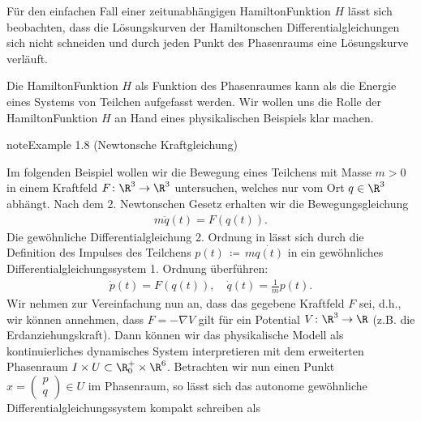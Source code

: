 \documentclass[letterpaper,10pt,english]{jupyterBook}
\begin{document}
\sphinxAtStartPar
Für den einfachen Fall einer zeitunabhängigen Hamilton\sphinxhyphen{}Funktion \(H\) lässt sich beobachten, dass die Lösungskurven der Hamiltonschen Differentialgleichungen sich nicht schneiden und durch jeden Punkt des Phasenraums eine Lösungskurve verläuft.

\sphinxAtStartPar
Die Hamilton\sphinxhyphen{}Funktion \(H\) als Funktion des Phasenraumes kann als die Energie eines Systems von Teilchen aufgefasst werden.
Wir wollen uns die Rolle der Hamilton\sphinxhyphen{}Funktion \(H\) an Hand eines physikalischen Beispiels klar machen.
\label{ode/hamilton:example-3}
\begin{sphinxadmonition}{note}{Example 1.8 (Newtonsche Kraftgleichung)}



\sphinxAtStartPar
Im folgenden Beispiel wollen wir die Bewegung eines Teilchens mit Masse \(m>0\) in einem Kraftfeld \(F \colon \R^3 \rightarrow \R^3\)  untersuchen, welches nur vom Ort \(q \in \R^3\) abhängt.
Nach dem 2. Newtonschen Gesetz erhalten wir die Bewegungsgleichung
\begin{equation}\label{equation:ode/hamilton:eq:newton}
\begin{split}m\ddot{q}(t) = F(q(t)).\end{split}
\end{equation}
\sphinxAtStartPar
Die gewöhnliche Differentialgleichung 2. Ordnung in {\hyperref[\detokenize{ode/hamilton:equation-eq-newton}]{}} lässt sich durch die Definition des Impulses des Teilchens \(p(t) \, \coloneqq \, m \dot{q(t)}\) in ein gewöhnliches Differentialgleichungssystem 1. Ordnung überführen:
\begin{equation*}
\begin{split}\dot{p}(t) = F(q(t)), \quad \dot{q}(t) = \frac{1}{m}p(t).\end{split}
\end{equation*}
\sphinxAtStartPar
Wir nehmen zur Vereinfachung nun an, dass das gegebene Kraftfeld \(F\)  sei, d.h., wir können annehmen, dass \(F = - \nabla V\) gilt für ein Potential \(V \colon \R^3 \rightarrow \R\) (z.B. die Erdanziehungskraft).
Dann können wir das physikalische Modell als kontinuierliches dynamisches System interpretieren mit dem erweiterten Phasenraum \(I \times U \subset \R^+_0 \times \R^6\).
Betrachten wir nun einen Punkt \(x = \begin{pmatrix} p \\ q\end{pmatrix} \in U\) im Phasenraum, so lässt sich das autonome gewöhnliche Differentialgleichungssystem kompakt schreiben als

\end{sphinxadmonition}
\end{document}
